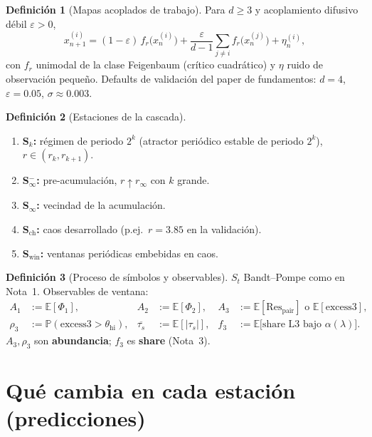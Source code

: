 \documentclass[11pt,a4paper]{article}
\theoremstyle{definition}
\newtheorem{definition}{Definici\'on}[section]
\theoremstyle{plain}
\theoremstyle{remark}
\newcommand{\Res}{\mathrm{Res}}
\newcommand{\excess}{\mathrm{excess3}}
\newcommand{\ts}{\tau_s}
\begin{document}
\begin{definition}[Mapas acoplados de trabajo]
\label{def:coupled}
Para $d\ge 3$ y acoplamiento difusivo d\'ebil $\varepsilon>0$,
\begin{equation}
x_{n+1}^{(i)}
=(1-\varepsilon)\,f_r\bigl(x_n^{(i)}\bigr)
+\frac{\varepsilon}{d-1}\sum_{j\ne i}f_r\bigl(x_n^{(j)}\bigr)
+\eta_n^{(i)},
\end{equation}
con $f_r$ unimodal de la clase Feigenbaum (cr\'itico cuadr\'atico) y
$\eta$ ruido de observaci\'on peque\~no. Defaults de validaci\'on del
paper de fundamentos: $d=4$, $\varepsilon=0.05$, $\sigma\approx 0.003$.
\end{definition}

\begin{definition}[Estaciones de la cascada]
\label{def:stations}
\begin{enumerate}[label=(\roman*)]
  \item \textbf{S$_k$:} r\'egimen de periodo $2^k$ (atractor peri\'odico
  estable de periodo $2^k$), $r\in(r_k,r_{k+1})$.
  \item \textbf{S$_\infty^-$:} pre-acumulaci\'on, $r\uparrow r_\infty$
  con $k$ grande.
  \item \textbf{S$_\infty$:} vecindad de la acumulaci\'on.
  \item \textbf{S$_{\mathrm{ch}}$:} caos desarrollado (p.ej.\ $r=3.85$
  en la validaci\'on).
  \item \textbf{S$_{\mathrm{win}}$:} ventanas peri\'odicas embebidas en
  caos.
\end{enumerate}
\end{definition}

\begin{definition}[Proceso de s\'imbolos y observables]
\label{def:obs}
$S_t$ Bandt--Pompe como en Nota~1. Observables de ventana:
\begin{align}
A_1&:=\mathbb{E}[\Phi_1],&
A_2&:=\mathbb{E}[\Phi_2],&
A_3&:=\mathbb{E}[\Res_{\mathrm{pair}}]
\text{ o }\mathbb{E}[\excess],\\
\rho_3&:=\mathbb{P}(\excess>\theta_{\mathrm{hi}}),&
\overline{\ts}&:=\mathbb{E}[|\ts|],&
f_3&:=\mathbb{E}\bigl[\text{share L3 bajo }\alpha(\lambda)\bigr].
\end{align}
$A_3,\rho_3$ son \textbf{abundancia}; $f_3$ es \textbf{share}
(Nota~3).
\end{definition}

\section{Qu\'e cambia en cada estaci\'on (predicciones)}
\label{sec:pred}
\end{document}
